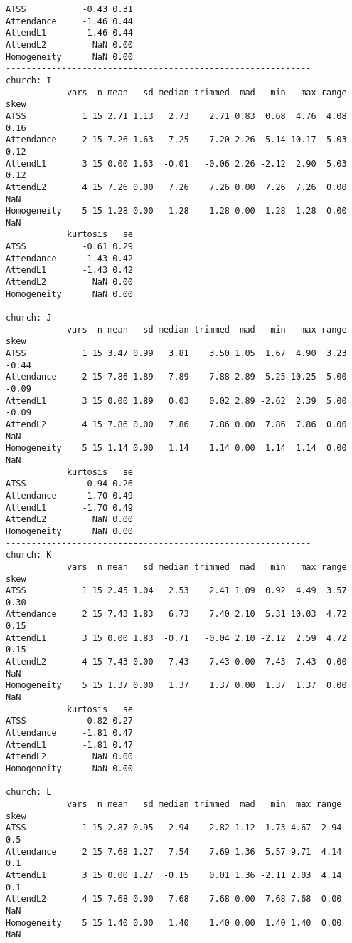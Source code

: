 \documentclass[
  11pt,
]{book}
\begin{document}
\begin{verbatim}
ATSS           -0.43 0.31
Attendance     -1.46 0.44
AttendL1       -1.46 0.44
AttendL2         NaN 0.00
Homogeneity      NaN 0.00
------------------------------------------------------------ 
church: I
            vars  n mean   sd median trimmed  mad   min   max range skew
ATSS           1 15 2.71 1.13   2.73    2.71 0.83  0.68  4.76  4.08 0.16
Attendance     2 15 7.26 1.63   7.25    7.20 2.26  5.14 10.17  5.03 0.12
AttendL1       3 15 0.00 1.63  -0.01   -0.06 2.26 -2.12  2.90  5.03 0.12
AttendL2       4 15 7.26 0.00   7.26    7.26 0.00  7.26  7.26  0.00  NaN
Homogeneity    5 15 1.28 0.00   1.28    1.28 0.00  1.28  1.28  0.00  NaN
            kurtosis   se
ATSS           -0.61 0.29
Attendance     -1.43 0.42
AttendL1       -1.43 0.42
AttendL2         NaN 0.00
Homogeneity      NaN 0.00
------------------------------------------------------------ 
church: J
            vars  n mean   sd median trimmed  mad   min   max range  skew
ATSS           1 15 3.47 0.99   3.81    3.50 1.05  1.67  4.90  3.23 -0.44
Attendance     2 15 7.86 1.89   7.89    7.88 2.89  5.25 10.25  5.00 -0.09
AttendL1       3 15 0.00 1.89   0.03    0.02 2.89 -2.62  2.39  5.00 -0.09
AttendL2       4 15 7.86 0.00   7.86    7.86 0.00  7.86  7.86  0.00   NaN
Homogeneity    5 15 1.14 0.00   1.14    1.14 0.00  1.14  1.14  0.00   NaN
            kurtosis   se
ATSS           -0.94 0.26
Attendance     -1.70 0.49
AttendL1       -1.70 0.49
AttendL2         NaN 0.00
Homogeneity      NaN 0.00
------------------------------------------------------------ 
church: K
            vars  n mean   sd median trimmed  mad   min   max range skew
ATSS           1 15 2.45 1.04   2.53    2.41 1.09  0.92  4.49  3.57 0.30
Attendance     2 15 7.43 1.83   6.73    7.40 2.10  5.31 10.03  4.72 0.15
AttendL1       3 15 0.00 1.83  -0.71   -0.04 2.10 -2.12  2.59  4.72 0.15
AttendL2       4 15 7.43 0.00   7.43    7.43 0.00  7.43  7.43  0.00  NaN
Homogeneity    5 15 1.37 0.00   1.37    1.37 0.00  1.37  1.37  0.00  NaN
            kurtosis   se
ATSS           -0.82 0.27
Attendance     -1.81 0.47
AttendL1       -1.81 0.47
AttendL2         NaN 0.00
Homogeneity      NaN 0.00
------------------------------------------------------------ 
church: L
            vars  n mean   sd median trimmed  mad   min  max range skew
ATSS           1 15 2.87 0.95   2.94    2.82 1.12  1.73 4.67  2.94  0.5
Attendance     2 15 7.68 1.27   7.54    7.69 1.36  5.57 9.71  4.14  0.1
AttendL1       3 15 0.00 1.27  -0.15    0.01 1.36 -2.11 2.03  4.14  0.1
AttendL2       4 15 7.68 0.00   7.68    7.68 0.00  7.68 7.68  0.00  NaN
Homogeneity    5 15 1.40 0.00   1.40    1.40 0.00  1.40 1.40  0.00  NaN

\end{verbatim}
\end{document}
